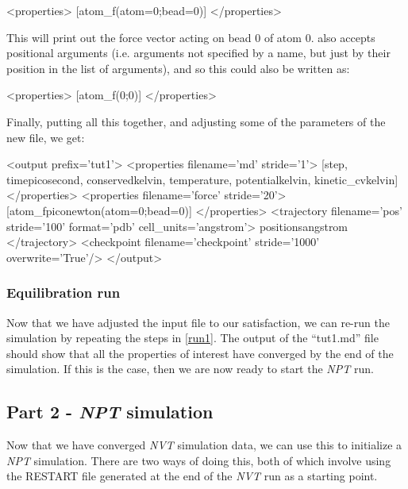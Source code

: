 \documentclass[11pt,english,fleqn]{report}
\newenvironment{code}{%
\footnotesize 
\verbatim
}{
\endverbatim
\normalsize
}
\begin{document}
\begin{code}
<properties> 
   [atom_f(atom=0;bead=0)] 
</properties>
\end{code}

This will print out the force vector acting on bead 0 of atom 0.
\ipi also accepts positional arguments
(i.e. arguments not specified by a name, but just by their position
in the list of arguments), and so this could also be written as:

\begin{code}
<properties> 
   [atom_f(0;0)] 
</properties>
\end{code}

Finally, putting all this together, and adjusting some
of the parameters of the new file, we get:

\small
\begin{code}
<output prefix='tut1'>
   <properties filename='md' stride='1'> 
      [step, time{picosecond}, conserved{kelvin}, 
       temperature, potential{kelvin}, kinetic_cv{kelvin}] 
   </properties>
   <properties filename='force' stride='20'> 
      [atom_f{piconewton}(atom=0;bead=0)] 
   </properties>
   <trajectory filename='pos' stride='100' format='pdb' cell_units='angstrom'> 
      positions{angstrom} 
   </trajectory>
   <checkpoint filename='checkpoint' stride='1000' overwrite='True'/>
</output>
\end{code}
\normalsize

\subsubsection{Equilibration run}

Now that we have adjusted the input file to our satisfaction, we can
re-run the simulation by 
repeating the steps in \ref{run1}. The output of the 
{}``tut1.md'' file should show that all the properties of interest
have converged by the end of the simulation. If this
is the case, then we are now ready to start the \emph{NPT} run.

\subsection{Part 2 - \emph{NPT} simulation}

Now that we have converged \emph{NVT} simulation data, we can use this to
initialize a \emph{NPT} simulation. There are two ways of doing this,
both of which involve using the RESTART file generated at
the end of the \emph{NVT} run as a starting point.
\end{document}
